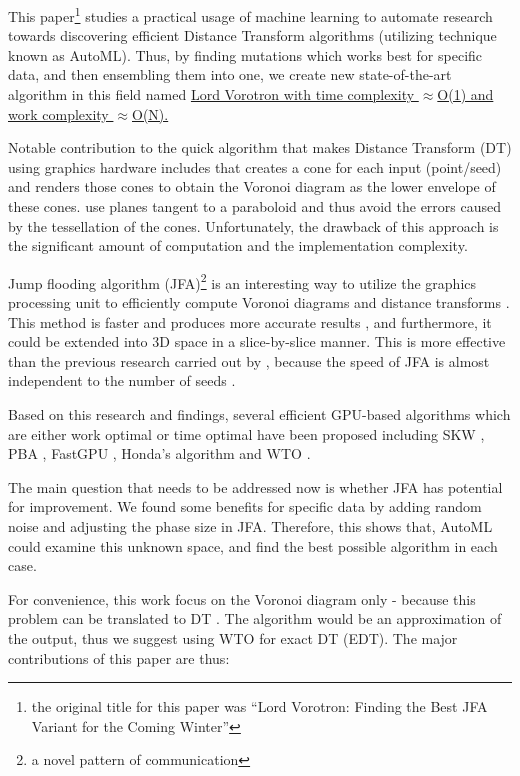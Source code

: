 \documentclass[format=acmsmall,screen,review,authordraft,nonacm]{acmart}
\newcommand{\ourjfa}{Lord Vorotron} %
\begin{document}
This paper\footnote{the original title for this paper was ``Lord Vorotron:
Finding the Best JFA Variant for the Coming Winter''} studies a practical usage of machine learning to automate research
towards discovering efficient Distance Transform algorithms (utilizing technique known as AutoML).
Thus, by finding mutations which works best for specific data, and then ensembling them into
one, we create new state-of-the-art algorithm in this field named \uline{\ourjfa \hspace{0.01cm} with
time complexity $\approx$O(1) and work complexity $\approx$O(N).}

Notable contribution to the quick algorithm that makes Distance Transform (DT)
using graphics hardware includes \citep{hoff1999fast} that creates a cone for
each input (point/seed) and renders those cones to obtain the Voronoi diagram as the lower envelope of these cones.
\cite{fischer2006fast} use planes tangent to a paraboloid and thus avoid the errors caused by the tessellation of the cones.
Unfortunately, the drawback of this approach is the significant amount of computation and the implementation complexity.

Jump flooding algorithm (JFA)\footnote{a novel pattern of
communication} is an interesting way to utilize the graphics processing unit to
efficiently compute Voronoi diagrams and distance transforms
\cite{rong2006jump}. This method is faster and produces more accurate results
\cite{rong2007variants}, and furthermore, it could be extended into 3D space in a slice-by-slice manner.
This is more effective than the previous research carried out by
\citep{sud2006interactive}, because the speed of JFA is almost independent to the number of seeds \cite{rong2007variants}.

Based on this research and findings, several efficient GPU-based algorithms which are either
work optimal or time optimal have been proposed including
SKW \cite{schneider2009gpu}, PBA \cite{cao2010parallel}, FastGPU \cite{de2017fast}, Honda's algorithm \cite{honda2017simple} and
WTO \cite{manduhu2019work}.

The main question that needs to be addressed now is whether JFA has potential
for improvement. We found some benefits for specific data by adding random noise
and adjusting the phase size in JFA. Therefore, this shows that, AutoML could examine this
unknown space, and find the best possible algorithm in each case.

For convenience, this work focus on the Voronoi diagram only - because this problem can be translated to DT \cite{rong2006jump}.
The algorithm would be an approximation of the output, thus we suggest using WTO
\cite{manduhu2019work} for exact DT (EDT). The major contributions of this paper are thus:
\end{document}
